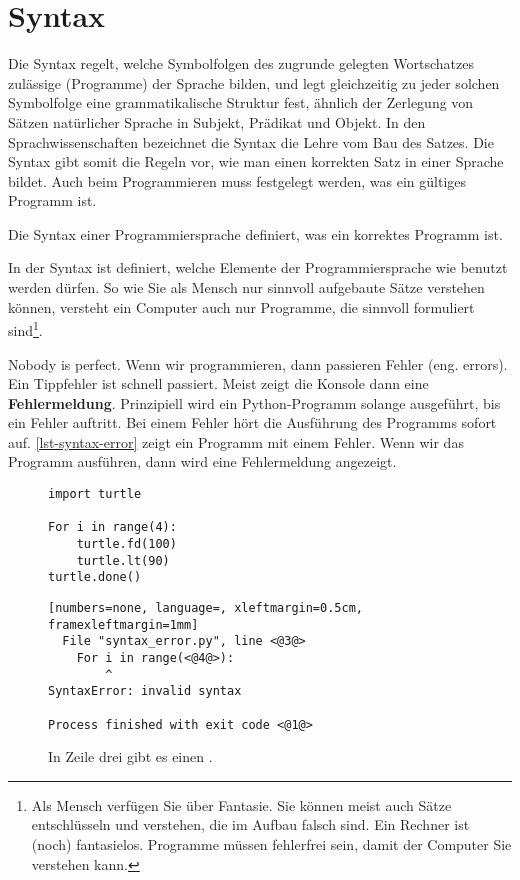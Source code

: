 \section{Syntax}

Die Syntax regelt, welche Symbolfolgen des zugrunde gelegten Wortschatzes zulässige  (Programme) der Sprache bilden, und legt gleichzeitig zu jeder solchen Symbolfolge eine grammatikalische Struktur fest, ähnlich der Zerlegung von Sätzen natürlicher Sprache in Subjekt, Prädikat und Objekt. In den Sprachwissenschaften bezeichnet die Syntax die Lehre vom Bau des Satzes. Die Syntax gibt somit die Regeln vor, wie man einen korrekten Satz in einer Sprache bildet. Auch beim Programmieren muss festgelegt werden, was ein gültiges Programm ist. 

\begin{definition}[Syntax]
Die Syntax einer Programmiersprache definiert, was ein korrektes Programm ist.
\end{definition}

In der Syntax ist definiert, welche Elemente der Programmiersprache wie benutzt werden dürfen. So wie Sie als Mensch nur sinnvoll aufgebaute Sätze verstehen können, versteht ein Computer auch nur Programme, die sinnvoll formuliert sind\footnote{Als Mensch verfügen Sie über Fantasie. Sie können meist auch Sätze entschlüsseln und verstehen, die im Aufbau falsch sind. Ein Rechner ist (noch) fantasielos. Programme müssen fehlerfrei sein, damit der Computer Sie verstehen kann.}.

Nobody is perfect. Wenn wir programmieren, dann passieren Fehler (eng. errors). Ein Tippfehler ist schnell passiert. Meist zeigt die Konsole dann eine \textbf{Fehlermeldung}. Prinzipiell wird ein Python-Programm solange ausgeführt, bis ein Fehler auftritt. Bei einem Fehler hört die Ausführung des Programms sofort auf. \autoref{lst-syntax-error} zeigt ein Programm mit einem Fehler. Wenn wir das Programm ausführen, dann wird eine Fehlermeldung angezeigt.

\begin{figure}[htb]
\centering
\begin{minipage}{0.35\linewidth}
\centering
\begin{lstlisting}[caption={Programm mit einem Syntaxfehler.}, label=lst-syntax-error, showstringspaces=false]
import turtle

For i in range(4):
    turtle.fd(100)
    turtle.lt(90)
turtle.done()
\end{lstlisting}
\end{minipage}
\hfill
\begin{minipage}{0.6\linewidth}
\centering
\begin{lstlisting}[numbers=none, language=, xleftmargin=0.5cm, framexleftmargin=1mm]
  File "syntax_error.py", line <@3@>
    For i in range(<@4@>):
        ^
SyntaxError: invalid syntax

Process finished with exit code <@1@>
\end{lstlisting}
\caption{In Zeile drei gibt es einen \protect{}.}
\label{lst-syntax-error-output}
\end{minipage}
\end{figure}

